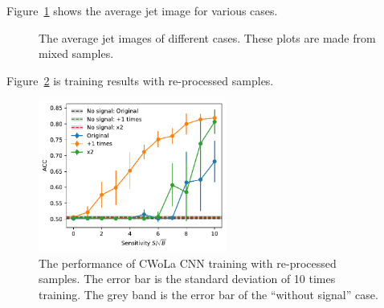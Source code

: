 \documentclass[12pt]{article}
\begin{document}
        Figure~\ref{fig:jet_constituent_average_jet_image_aug_1_x2} shows the average jet image for various cases.
        \begin{figure}[htpb]
            \centering
            \caption{The average jet images of different cases. These plots are made from mixed samples.}
            \label{fig:jet_constituent_average_jet_image_aug_1_x2}
        \end{figure}

        Figure~\ref{fig:cwola_hunting_cnn_acc_x2_luminosity_re-processed_sample} is training results with re-processed samples.
        \begin{figure}[htpb]
            \centering
            \includegraphics[width=0.55\textwidth]{HVmodel_CWoLa_CNN_aug_1_x2_re-process.pdf}
            \caption{The performance of CWoLa CNN training with re-processed samples. The error bar is the standard deviation of 10 times training. The grey band is the error bar of the ``without signal'' case.}
            \label{fig:cwola_hunting_cnn_acc_x2_luminosity_re-processed_sample}
        \end{figure}
\end{document}
